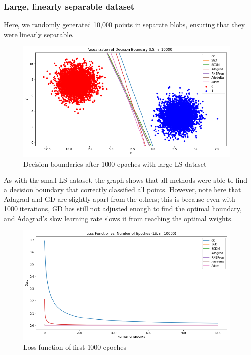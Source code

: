 \documentclass[twoside,11pt]{homework}
\begin{document}
\subsubsection*{Large, linearly separable dataset}
Here, we randomly generated 10,000 points in separate blobs, ensuring that they were linearly separable.

\begin{figure}[H]
		\centering
		\includegraphics[scale=.5]{q5/sep_10000/lines_n10000.png}
		\caption{Decision boundaries after 1000 epoches with large LS dataset}
	\end{figure}
As with the small LS dataset, the graph shows that all methods were able to find a decision boundary that correctly classified all points. However, note here that Adagrad and GD are slightly apart from the others; this is because even with 1000 iterations, GD has still not adjusted enough to find the optimal boundary, and Adagrad's slow learning rate slows it from reaching the optimal weights.

	\begin{figure}[H]
		\centering
		\includegraphics[scale=.5]{q5/sep_10000/loss_n10000.png}
		\caption{Loss function of first 1000 epoches}
	\end{figure}
\end{document}
